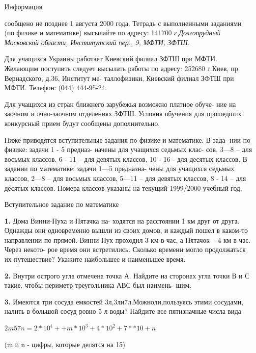 \documentclass[10pt,onecolumn,a4paper]{article}
\begin{document}
\thispagestyle{empty}
\newpage
\begin{center}
    Информация
\end{center}
\begin{multicols}{3}
\noindent сообщено не позднее 1 августа 2000 года.
Тетрадь с выполненными заданиями (по физике и математике) высылайте по адресу: 141700
\emph{г.Долгопрудный Московской области, Институтский пер., 9, МФТИ, ЗФТШ.}

Для учащихся Украины работает Киевский филиал ЗФТШ при МФТИ. Желающим поступить следует высылать работы по адресу: 252680 г.Киев, пр. Вернадского, д.36, Институт ме- таллофизики, Киевский филиал ЗФТШ при МФТИ. Телефон: (044) 444-95-24.

Для учащихся из стран ближнего зарубежья возможно платное обуче- ние на заочном и очно-заочном отделениях ЗФТШ. Условия обучения для прошедших конкурсный прием будут сообщены дополнительно.

Ниже приводятся вступительные задания по физике и математике. В зада- нии по физике: задачи 1 - 5 предназ- начены для учащихся седьмых клас- сов, 3—8 – для восьмых классов, 6 - 11 – для девятых классов, 10 - 16 - для десятых классов. В задании по математике: задачи 1—5 предназна- чены для учащихся седьмых классов, 2—8 – для восьмых классов, 5—11 – для девятых классов, 8 - 14 – для десятых классов. Номера классов указаны на текущий 1999/2000 учебный год.
\begin{center}
Вступительное задание по математике
\end{center}

\textbf{1.} Дома Винни-Пуха и Пятачка на- ходятся на расстоянии 1 км друг от друга. Однажды они одновременно вышли из своих домов, и каждый пошел в каком-то направлении по прямой. Винни-Пух проходил 3 км в час, а Пятачок – 4 км в час. Через некото- рое время они встретились. Сколько времени могло продолжаться их путешествие? Укажите наибольшее и наименьшее время.

\textbf{2.} Внутри острого угла отмечена точка А. Найдите на сторонах угла точки В и С такие, чтобы периметр треугольника АВС был наимень- шим.

\textbf{3.} Имеются три сосуда емкостей 3л,3ли7л.Можноли,пользуясь этими сосудами, налить в большой сосуд ровно 5 л воды?
Найдите все пятизначные числа вида
\begin{right}

$2m57n=2*10^4++m*10^3+4*10^2+7**10+n$

(m и n - цифры,  которые делятся на 15)
\end{right}


\end{multicols}
\end{document}
